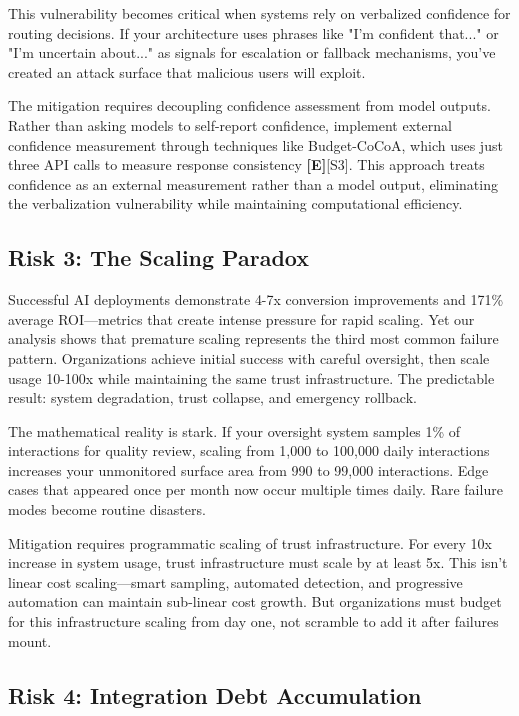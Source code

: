 \documentclass[a4paper,11pt]{article}
\newcommand{\elabel}{\textbf{\textcolor{ecolor}{[E]}}}
\begin{document}
This vulnerability becomes critical when systems rely on verbalized confidence for routing decisions. If your architecture uses phrases like "I'm confident that..." or "I'm uncertain about..." as signals for escalation or fallback mechanisms, you've created an attack surface that malicious users will exploit.


The mitigation requires decoupling confidence assessment from model outputs. Rather than asking models to self-report confidence, implement external confidence measurement through techniques like Budget-CoCoA, which uses just three API calls to measure response consistency \elabel{}\textcolor{primary}{[S3]}. This approach treats confidence as an external measurement rather than a model output, eliminating the verbalization vulnerability while maintaining computational efficiency.


\subsection{Risk 3: The Scaling Paradox}

Successful AI deployments demonstrate 4-7x conversion improvements and 171\% average ROI—metrics that create intense pressure for rapid scaling. Yet our analysis shows that premature scaling represents the third most common failure pattern. Organizations achieve initial success with careful oversight, then scale usage 10-100x while maintaining the same trust infrastructure. The predictable result: system degradation, trust collapse, and emergency rollback.


The mathematical reality is stark. If your oversight system samples 1\% of interactions for quality review, scaling from 1,000 to 100,000 daily interactions increases your unmonitored surface area from 990 to 99,000 interactions. Edge cases that appeared once per month now occur multiple times daily. Rare failure modes become routine disasters.


Mitigation requires programmatic scaling of trust infrastructure. For every 10x increase in system usage, trust infrastructure must scale by at least 5x. This isn't linear cost scaling—smart sampling, automated detection, and progressive automation can maintain sub-linear cost growth. But organizations must budget for this infrastructure scaling from day one, not scramble to add it after failures mount.


\subsection{Risk 4: Integration Debt Accumulation}
\end{document}
